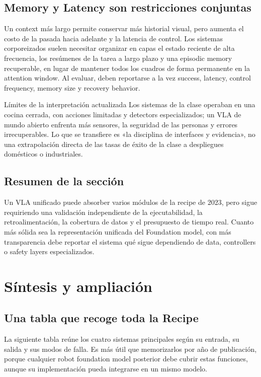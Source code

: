 \documentclass[a4paper]{article}
\begin{document}
\subsection{Memory y Latency son restricciones conjuntas}

Un context más largo permite conservar más historial visual, pero aumenta el costo de la pasada hacia adelante y la latencia de control. Los sistemas corporeizados suelen necesitar organizar en capas el estado reciente de alta frecuencia, los resúmenes de la tarea a largo plazo y una episodic memory recuperable, en lugar de mantener todos los cuadros de forma permanente en la attention window. Al evaluar, deben reportarse a la vez success, latency, control frequency, memory size y recovery behavior.

\begin{warningbox}{Límites de la interpretación actualizada}
Los sistemas de la clase operaban en una cocina cerrada, con acciones limitadas y detectors especializados; un VLA de mundo abierto enfrenta más sensores, la seguridad de las personas y errores irrecuperables. Lo que se transfiere es «la disciplina de interfaces y evidencia», no una extrapolación directa de las tasas de éxito de la clase a despliegues domésticos o industriales.
\end{warningbox}

\subsection{Resumen de la sección}

Un VLA unificado puede absorber varios módulos de la recipe de 2023, pero sigue requiriendo una validación independiente de la ejecutabilidad, la retroalimentación, la cobertura de datos y el presupuesto de tiempo real. Cuanto más sólida sea la representación unificada del Foundation model, con más transparencia debe reportar el sistema qué sigue dependiendo de data, controllers o safety layers especializados.
\section{Síntesis y ampliación}

\subsection{Una tabla que recoge toda la Recipe}

La siguiente tabla reúne los cuatro sistemas principales según su entrada, su salida y sus modos de falla. Es más útil que memorizarlos por año de publicación, porque cualquier robot foundation model posterior debe cubrir estas funciones, aunque su implementación pueda integrarse en un mismo modelo.
\end{document}
